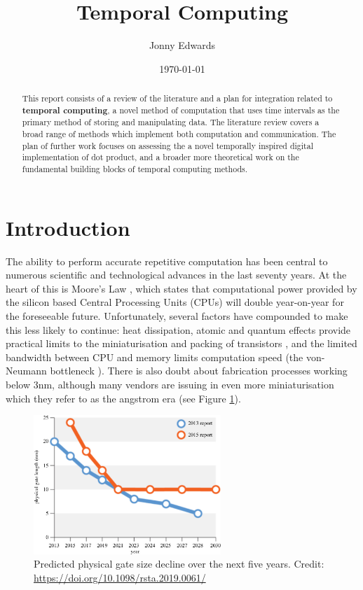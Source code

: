 \documentclass{article}
\title{Temporal Computing}
\author{Jonny Edwards}
\date{\today}
\begin{document}
\maketitle
\begin{abstract}
This report consists of a review of the literature and a plan for integration related to \textbf{temporal computing}, a novel method of computation that uses time intervals as the primary method of storing and manipulating data. The literature review covers a broad range of methods which implement both computation and communication. The plan of further work focuses on assessing the a novel temporally inspired digital implementation of dot product, and a broader more theoretical work on the fundamental building blocks of temporal computing methods.    
\end{abstract}

\section{Introduction}
The ability to perform accurate repetitive computation has been central to numerous scientific and technological advances in the last seventy years. At the heart of this is Moore's Law \cite{Moore:2000:CMC:333067.333074}, which states that computational power provided by the silicon based Central Processing Units (CPUs) will double year-on-year for the foreseeable future. Unfortunately, several factors have compounded to make this less likely to continue: heat dissipation, atomic and quantum effects provide practical limits to the miniaturisation and packing of transistors \cite{moorefail}, and the limited bandwidth between CPU and memory limits computation speed (the von-Neumann bottleneck \cite{Backus:1978:PLV:359576.359579}). There is also doubt about  fabrication processes working below 3nm, although many vendors are issuing in even more miniaturisation which they refer to as the angstrom era (see Figure \ref{fig:intel}).


\begin{figure}[ht]
  \centering
  \includegraphics[width=200pt]{figures/intel2.jpg}
  \caption{Predicted physical gate size decline over the next five years. Credit: \url{https://doi.org/10.1098/rsta.2019.0061/}}
  \label{fig:intel}
\end{figure}
\end{document}

